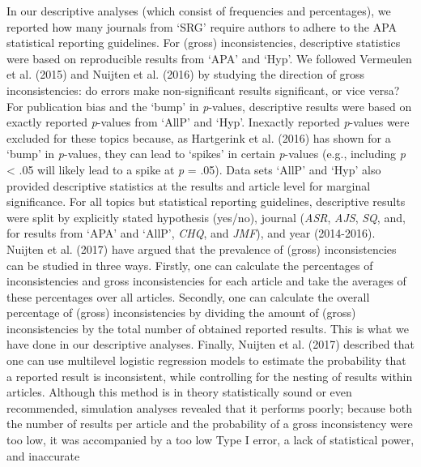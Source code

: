 \documentclass[
  12pt,
]{article}
\begin{document}
In our descriptive analyses (which consist of frequencies and
percentages), we reported how many journals from `SRG' require authors
to adhere to the APA statistical reporting guidelines. For (gross)
inconsistencies, descriptive statistics were based on reproducible
results from `APA' and `Hyp'. We followed Vermeulen et al. (2015) and
Nuijten et al. (2016) by studying the direction of gross
inconsistencies: do errors make non-significant results significant, or
vice versa? For publication bias and the `bump' in \emph{p}-values,
descriptive results were based on exactly reported \emph{p}-values from
`AllP' and `Hyp'. Inexactly reported \emph{p}-values were excluded for
these topics because, as Hartgerink et al. (2016) has shown for a `bump'
in \emph{p}-values, they can lead to `spikes' in certain \emph{p}-values
(e.g., including \emph{p} \textless{} .05 will likely lead to a spike at
\emph{p} = .05). Data sets `AllP' and `Hyp' also provided descriptive
statistics at the results and article level for marginal significance.
For all topics but statistical reporting guidelines, descriptive results
were split by explicitly stated hypothesis (yes/no), journal
(\emph{ASR}, \emph{AJS}, \emph{SQ}, and, for results from `APA' and
`AllP', \emph{CHQ}, and \emph{JMF}), and year (2014-2016).\\
\hspace*{0.333em}\hspace*{0.333em}\hspace*{0.333em}\hspace*{0.333em}Nuijten
et al. (2017) have argued that the prevalence of (gross) inconsistencies
can be studied in three ways. Firstly, one can calculate the percentages
of inconsistencies and gross inconsistencies for each article and take
the averages of these percentages over all articles. Secondly, one can
calculate the overall percentage of (gross) inconsistencies by dividing
the amount of (gross) inconsistencies by the total number of obtained
reported results. This is what we have done in our descriptive analyses.
Finally, Nuijten et al. (2017) described that one can use multilevel
logistic regression models to estimate the probability that a reported
result is inconsistent, while controlling for the nesting of results
within articles. Although this method is in theory statistically sound
or even recommended, simulation analyses revealed that it performs
poorly; because both the number of results per article and the
probability of a gross inconsistency were too low, it was accompanied by
a too low Type I error, a lack of statistical power, and inaccurate
\end{document}
